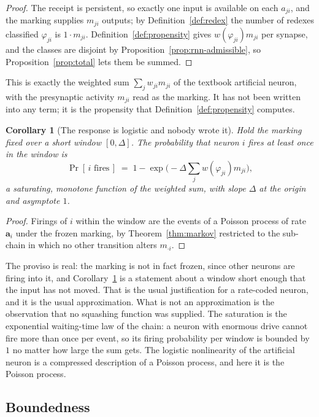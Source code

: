 \documentclass[11pt,a4paper]{article}
\theoremstyle{plain}
\newtheorem{corollary}[theorem]{Corollary}
\theoremstyle{definition}
\theoremstyle{remark}
\newcommand{\prop}{\mathbf{a}}
\newcommand{\wmap}{w}
\begin{document}
\begin{proof}
The receipt is persistent, so exactly one input is available on each $a_{ji}$, and the marking
supplies $m_{ji}$ outputs; by Definition~\ref{def:redex} the number of redexes classified $\varphi_{ji}$
is $1 \cdot m_{ji}$. Definition~\ref{def:propensity} gives $\wmap(\varphi_{ji})m_{ji}$ per synapse,
and the classes are disjoint by Proposition~\ref{prop:rnn-admissible}, so
Proposition~\ref{prop:total} lets them be summed.
\end{proof}

This is exactly the weighted sum $\sum_j w_{ji} m_{ji}$ of the textbook artificial neuron, with the
presynaptic activity $m_{ji}$ read as the marking. It has not been written into any term; it is the
propensity that Definition~\ref{def:propensity} computes.

\begin{corollary}[The response is logistic and nobody wrote it]
\label{cor:sigmoid}
Hold the marking fixed over a short window $[0,\Delta]$. The probability that neuron $i$ fires at
least once in the window is
\[
\Pr[\,\text{$i$ fires}\,] \;=\; 1 - \exp\!\big(-\Delta \textstyle\sum_j \wmap(\varphi_{ji}) m_{ji}\big),
\]
a saturating, monotone function of the weighted sum, with slope $\Delta$ at the origin and asymptote
$1$.
\end{corollary}

\begin{proof}
Firings of $i$ within the window are the events of a Poisson process of rate $\prop_i$ under the
frozen marking, by Theorem~\ref{thm:markov} restricted to the sub-chain in which no other transition
alters $m_{\cdot i}$.
\end{proof}

The proviso is real: the marking is not in fact frozen, since other neurons are firing into it, and
Corollary~\ref{cor:sigmoid} is a statement about a window short enough that the input has not moved.
That is the usual justification for a rate-coded neuron, and it is the usual approximation. What is
not an approximation is the observation that no squashing function was supplied. The saturation is
the exponential waiting-time law of the chain: a neuron with enormous drive cannot fire more than
once per event, so its firing probability per window is bounded by $1$ no matter how large the sum
gets. The logistic nonlinearity of the artificial neuron is a compressed description of a Poisson
process, and here it is the Poisson process.

\subsection{Boundedness}
\end{document}
